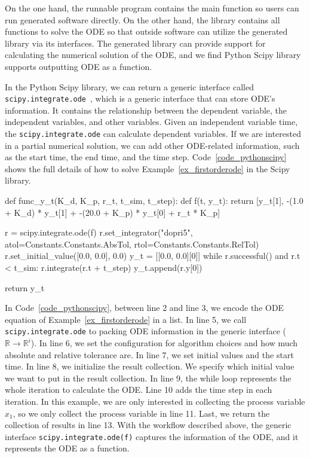On the one hand, the runnable program contains the main function so users can run generated software directly. On the other hand, the library contains all functions to solve the ODE so that outside software can utilize the generated library via its interfaces. The generated library can provide support for calculating the numerical solution of the ODE, and we find Python Scipy library supports outputting ODE as a function.

In the Python Scipy library, we can return a generic interface called \verb|scipy.integrate.ode|~\citep{scipyfun}, which is a generic interface that can store ODE's information. It contains the relationship between the dependent variable, the independent variables, and other variables. Given an independent variable time, the \verb|scipy.integrate.ode| can calculate dependent variables. If we are interested in a partial numerical solution, we can add other ODE-related information, such as the start time, the end time, and the time step. Code~\ref{code_pythonscipy} shows the full details of how to solve Example~\ref{ex_firstorderode} in the Scipy library.

\begin{listing}[ht]
\begin{python1}
def func_y_t(K_d, K_p, r_t, t_sim, t_step):
    def f(t, y_t):
        return [y_t[1], -(1.0 + K_d) * y_t[1] + -(20.0 + K_p) * y_t[0] + r_t * K_p]
    
    r = scipy.integrate.ode(f)
    r.set_integrator("dopri5", atol=Constants.Constants.AbsTol, rtol=Constants.Constants.RelTol)
    r.set_initial_value([0.0, 0.0], 0.0)
    y_t = [[0.0, 0.0][0]]
    while r.successful() and r.t < t_sim:
        r.integrate(r.t + t_step)
        y_t.append(r.y[0])
    
    return y_t
\end{python1}
\label{code_pythonscipy}
\end{listing}
In Code~\ref{code_pythonscipy}, between line 2 and line 3, we encode the ODE equation of Example~\ref{ex_firstorderode} in a list. In line 5, we call \verb|scipy.integrate.ode| to packing ODE information in the generic interface ($\mathbb{R} \rightarrow \mathbb{R}^i$). In line 6, we set the configuration for algorithm choices and how much absolute and relative tolerance are. In line 7, we set initial values and the start time. In line 8, we initialize the result collection. We specify which initial value we want to put in the result collection. In line 9, the while loop represents the whole iteration to calculate the ODE.  Line 10 adds the time step in each iteration. In this example, we are only interested in collecting the process variable $x_1$, so we only collect the process variable in line 11. Last, we return the collection of results in line 13. With the workflow described above, the generic interface \verb|scipy.integrate.ode(f)| captures the information of the ODE, and it represents the ODE as a function.

